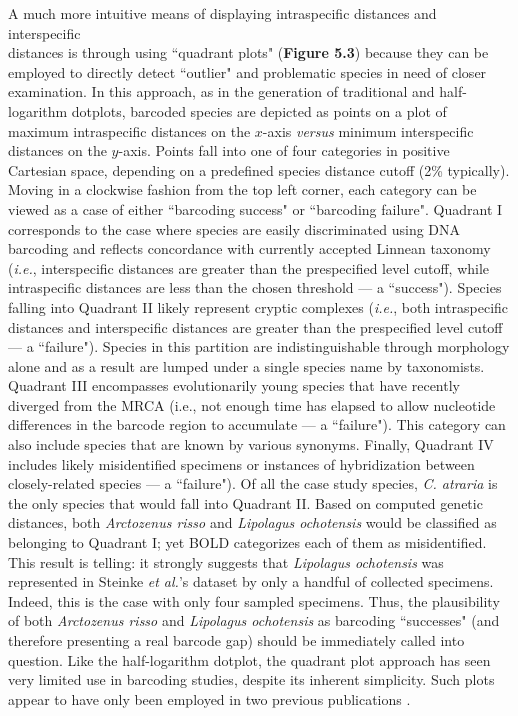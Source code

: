 A much more intuitive means of displaying intraspecific distances and interspecific \\ distances is through using ``quadrant plots" (\textbf{Figure 5.3}) because they can be employed to directly detect ``outlier" and problematic species in need of closer examination. In this approach, as in the generation of traditional and half-logarithm dotplots, barcoded species are depicted as points on a plot of maximum intraspecific distances on the $x$-axis \textit{versus} minimum interspecific distances on the $y$-axis. Points fall into one of four categories in positive Cartesian space, depending on a predefined species distance cutoff (2\% typically). Moving in a clockwise fashion from the top left corner, each category can be viewed as a case of either ``barcoding success" or ``barcoding failure". Quadrant I corresponds to the case where species are easily discriminated using DNA barcoding and reflects concordance with currently accepted Linnean taxonomy (\textit{i.e.}, interspecific distances are greater than the prespecified level cutoff, while intraspecific distances are less than the chosen threshold --- a ``success"). Species falling into Quadrant II likely represent cryptic complexes (\textit{i.e.}, both intraspecific distances and interspecific distances are greater than the prespecified level cutoff --- a ``failure"). Species in this partition are indistinguishable through morphology alone and as a result are lumped under a single species name by taxonomists. Quadrant III encompasses evolutionarily young species that have recently diverged from the MRCA (i.e., not enough time has elapsed to allow nucleotide differences in the barcode region to accumulate --- a ``failure"). This category can also include species that are known by various synonyms. Finally, Quadrant IV includes likely misidentified specimens or instances of hybridization between closely-related species --- a ``failure"). Of all the case study species, \textit{C. atraria} is the only species that would fall into Quadrant II. Based on computed genetic distances, both \textit{Arctozenus risso} and \textit{Lipolagus ochotensis} would be classified as belonging to Quadrant I; yet BOLD categorizes each of them as misidentified. This result is telling: it strongly suggests that \textit{Lipolagus ochotensis} was represented in Steinke \textit{et al.}'s \cite{steinke2009dna} dataset by only a handful of collected specimens. Indeed, this is the case with only four sampled specimens. Thus, the plausibility of both \textit{Arctozenus risso} and \textit{Lipolagus ochotensis} as barcoding ``successes" (and therefore presenting a real barcode gap) should be immediately called into question. Like the half-logarithm dotplot, the quadrant plot approach has seen very limited use in barcoding studies, despite its inherent simplicity. Such plots appear to have only been employed in two previous publications \cite{hebert2004identification, hubert2015dna}. 

